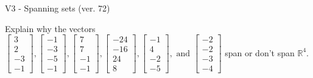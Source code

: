 \begin{exercise}
  \begin{exerciseTitle}V3 - Spanning sets (ver. 72)\end{exerciseTitle}
  \begin{exerciseStatement}
    Explain why the vectors \(\left[\begin{array}{r}
3 \\
2 \\
-3 \\
-1
\end{array}\right] , \left[\begin{array}{r}
-1 \\
-3 \\
-5 \\
-1
\end{array}\right] , \left[\begin{array}{r}
7 \\
7 \\
-1 \\
-1
\end{array}\right] , \left[\begin{array}{r}
-24 \\
-16 \\
24 \\
8
\end{array}\right] , \left[\begin{array}{r}
-1 \\
4 \\
-2 \\
-5
\end{array}\right] , \text{ and } \left[\begin{array}{r}
-2 \\
-2 \\
-3 \\
-4
\end{array}\right]\) span or don't span \(\mathbb{R}^4\). 
	



\end{exerciseStatement}
\end{exercise}
